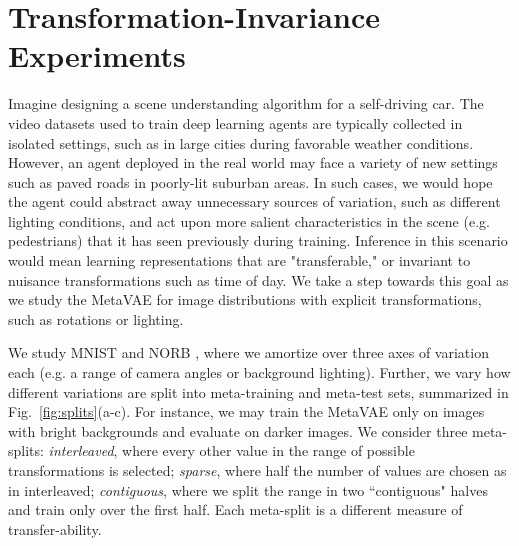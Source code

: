 \section{Transformation-Invariance Experiments}
Imagine designing a scene understanding algorithm for a self-driving car. The video datasets used to train deep learning agents are typically collected in isolated settings, such as in large cities during favorable weather conditions.
However, an agent deployed in the real world may face a variety of new settings such as paved roads in poorly-lit suburban areas.
In such cases, we would hope the agent could abstract away unnecessary sources of variation, such as different lighting conditions, and act upon more salient characteristics in the scene (e.g. pedestrians) that it has seen previously during training. 
Inference in this scenario would mean learning representations that are "transferable," or invariant to nuisance transformations such as time of day.
We take a step towards this goal as 
we study the MetaVAE for image distributions with explicit transformations, such as rotations or lighting. 
 
We study MNIST \cite{lecun1998mnist} and NORB \cite{lecun2004learning}, where we amortize over three axes of variation each (e.g. a range of camera angles or background lighting). Further, we vary how different variations are split into meta-training and meta-test sets, summarized in Fig.~\ref{fig:splits}(a-c). For instance, we may train the MetaVAE only on images with bright backgrounds and evaluate on darker images. We consider three meta-splits: \textit{interleaved}, where every other value in the range of possible transformations is selected; \textit{sparse}, where half the number of values are chosen as in interleaved; \textit{contiguous}, where we split the range in two ``contiguous" halves and train only over the first half. Each meta-split is a different measure of transfer-ability. 

